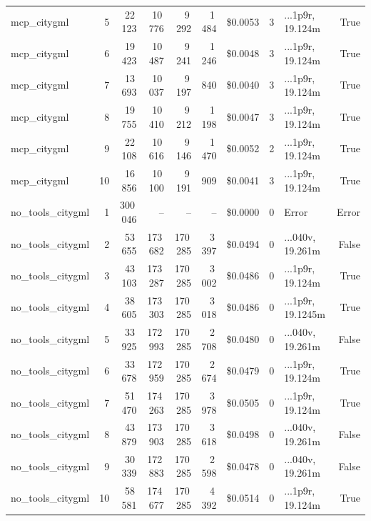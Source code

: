 \documentclass[a4paper,11pt]{article}
\begin{document}
\begin{table}[H]
{\begin{tabular}{l r r r r r r r l r}
mcp\_citygml & 5 & 22\,123 & 10\,776 & 9\,292 & 1\,484 & \$0.0053 & 3 & ...1p9r, 19.124m & True \\
mcp\_citygml & 6 & 19\,423 & 10\,487 & 9\,241 & 1\,246 & \$0.0048 & 3 & ...1p9r, 19.124m & True \\
mcp\_citygml & 7 & 13\,693 & 10\,037 & 9\,197 & 840 & \$0.0040 & 3 & ...1p9r, 19.124m & True \\
mcp\_citygml & 8 & 19\,755 & 10\,410 & 9\,212 & 1\,198 & \$0.0047 & 3 & ...1p9r, 19.124m & True \\
mcp\_citygml & 9 & 22\,108 & 10\,616 & 9\,146 & 1\,470 & \$0.0052 & 2 & ...1p9r, 19.124m & True \\
mcp\_citygml & 10 & 16\,856 & 10\,100 & 9\,191 & 909 & \$0.0041 & 3 & ...1p9r, 19.124m & True \\
\midrule
no\_tools\_citygml & 1 & 300\,046 & -- & -- & -- & \$0.0000 & 0 & Error & Error \\
no\_tools\_citygml & 2 & 53\,655 & 173\,682 & 170\,285 & 3\,397 & \$0.0494 & 0 & ...040v, 19.261m & False \\
no\_tools\_citygml & 3 & 43\,103 & 173\,287 & 170\,285 & 3\,002 & \$0.0486 & 0 & ...1p9r, 19.124m & True \\
no\_tools\_citygml & 4 & 38\,605 & 173\,303 & 170\,285 & 3\,018 & \$0.0486 & 0 & ...1p9r, 19.1245m & True \\
no\_tools\_citygml & 5 & 33\,925 & 172\,993 & 170\,285 & 2\,708 & \$0.0480 & 0 & ...040v, 19.261m & False \\
no\_tools\_citygml & 6 & 33\,678 & 172\,959 & 170\,285 & 2\,674 & \$0.0479 & 0 & ...1p9r, 19.124m & True \\
no\_tools\_citygml & 7 & 51\,470 & 174\,263 & 170\,285 & 3\,978 & \$0.0505 & 0 & ...1p9r, 19.124m & True \\
no\_tools\_citygml & 8 & 43\,879 & 173\,903 & 170\,285 & 3\,618 & \$0.0498 & 0 & ...040v, 19.261m & False \\
no\_tools\_citygml & 9 & 30\,339 & 172\,883 & 170\,285 & 2\,598 & \$0.0478 & 0 & ...040v, 19.261m & False \\
no\_tools\_citygml & 10 & 58\,581 & 174\,677 & 170\,285 & 4\,392 & \$0.0514 & 0 & ...1p9r, 19.124m & True \\
\bottomrule
\end{tabular}}
\end{table}
\end{document}
